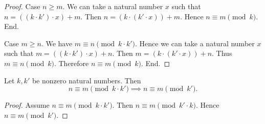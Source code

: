 \documentclass[../../natural-numbers.ftl.tex]{subfiles}
\begin{document}
\begin{forthel}
\begin{proof}
      Case $n \geq m$.
        We can take a natural number $x$ such that $n = ((k \cdot k') \cdot x) + m$.
        Then $n = (k \cdot (k' \cdot x)) + m$.
        Hence $n \equiv m \pmod{k}$.
      End.

      Case $m \geq n$.
        We have $m \equiv n \pmod{k \cdot k'}$.
        Hence we can take a natural number $x$ such that $m = ((k \cdot k') \cdot x) + n$.
        Then $m = (k \cdot (k' \cdot x)) + n$.
        Thus $m \equiv n \pmod{k}$.
        Therefore $n \equiv m \pmod{k}$.
      End.
    \end{proof}

    \begin{corollary}[NN 03 03 282418]
      Let $k,k'$ be nonzero natural numbers.
      Then \[ n \equiv m \pmod{k \cdot k'} \implies n \equiv m \pmod{k'}. \]
    \end{corollary}
    \begin{proof}
      Assume $n \equiv m \pmod{k \cdot k'}$.
      Then $n \equiv m \pmod{k' \cdot k}$.
      Hence $n \equiv m \pmod{k'}$.
    \end{proof}
  \end{forthel}
\end{document}
